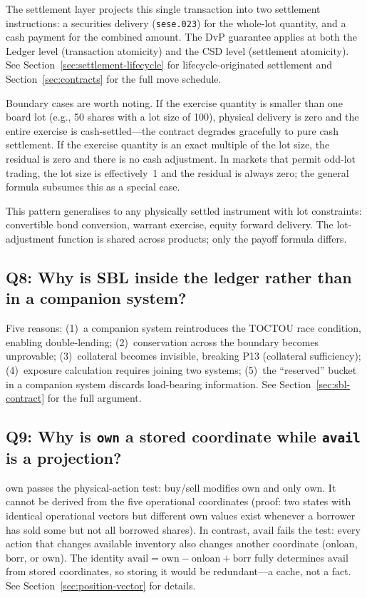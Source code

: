 \documentclass[11pt,a4paper]{article}
\begin{document}
The settlement layer projects this single transaction into two settlement instructions: a securities delivery (\texttt{sese.023}) for the whole-lot quantity, and a cash payment for the combined amount. The DvP guarantee applies at both the Ledger level (transaction atomicity) and the CSD level (settlement atomicity). See Section~\ref{sec:settlement-lifecycle} for lifecycle-originated settlement and Section~\ref{sec:contracts} for the full move schedule.

Boundary cases are worth noting. If the exercise quantity is smaller than one board lot (e.g., 50 shares with a lot size of 100), physical delivery is zero and the entire exercise is cash-settled---the contract degrades gracefully to pure cash settlement. If the exercise quantity is an exact multiple of the lot size, the residual is zero and there is no cash adjustment. In markets that permit odd-lot trading, the lot size is effectively~1 and the residual is always zero; the general formula subsumes this as a special case.

This pattern generalises to any physically settled instrument with lot constraints: convertible bond conversion, warrant exercise, equity forward delivery. The lot-adjustment function is shared across products; only the payoff formula differs.

\subsection*{Q8: Why is SBL inside the ledger rather than in a companion system?}

Five reasons: (1)~a companion system reintroduces the TOCTOU race condition, enabling double-lending; (2)~conservation across the boundary becomes unprovable; (3)~collateral becomes invisible, breaking P13 (collateral sufficiency); (4)~exposure calculation requires joining two systems; (5)~the ``reserved'' bucket in a companion system discards load-bearing information. See Section~\ref{sec:sbl-contract} for the full argument.

\subsection*{Q9: Why is \texttt{own} a stored coordinate while \texttt{avail} is a projection?}

$\mathrm{own}$ passes the physical-action test: buy/sell modifies $\mathrm{own}$ and only $\mathrm{own}$. It cannot be derived from the five operational coordinates (proof: two states with identical operational vectors but different $\mathrm{own}$ values exist whenever a borrower has sold some but not all borrowed shares). In contrast, $\mathrm{avail}$ fails the test: every action that changes available inventory also changes another coordinate ($\mathrm{onloan}$, $\mathrm{borr}$, or $\mathrm{own}$). The identity $\mathrm{avail} = \mathrm{own} - \mathrm{onloan} + \mathrm{borr}$ fully determines $\mathrm{avail}$ from stored coordinates, so storing it would be redundant---a cache, not a fact. See Section~\ref{sec:position-vector} for details.
\end{document}
